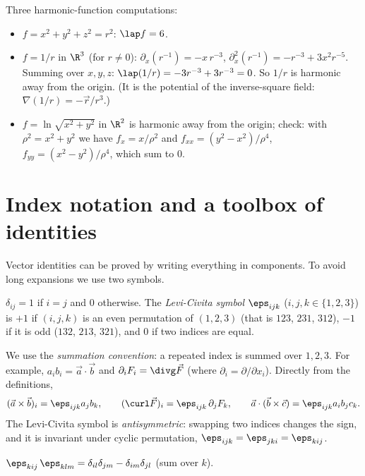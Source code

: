 \begin{example}
Three harmonic-function computations:
\begin{itemize}
  \item $f=x^2+y^2+z^2=r^2$: $\lap f=6$.
  \item $f=1/r$ in $\R^3$ (for $r\ne0$): $\partial_x(r^{-1})=-x\,r^{-3}$, $\partial_x^2(r^{-1})=-r^{-3}+3x^2r^{-5}$. Summing over $x,y,z$: $\lap(1/r)=-3r^{-3}+3r^{-3}=0$. So $1/r$ is harmonic away from the origin. (It is the potential of the inverse-square field: $\nabla(1/r)=-\vec r/r^3$.)
  \item $f=\ln\sqrt{x^2+y^2}$ in $\R^2$ is harmonic away from the origin; check: with $\rho^2=x^2+y^2$ we have $f_x=x/\rho^2$ and $f_{xx}=(y^2-x^2)/\rho^4$, $f_{yy}=(x^2-y^2)/\rho^4$, which sum to $0$.
\end{itemize}
\end{example}

\section{Index notation and a toolbox of identities}

Vector identities can be proved by writing everything in components. To avoid long expansions we use two symbols.

\begin{definition}
$\delta_{ij}=1$ if $i=j$ and $0$ otherwise. The \emph{Levi-Civita symbol} $\eps_{ijk}$ ($i,j,k\in\{1,2,3\}$) is $+1$ if $(i,j,k)$ is an even permutation of $(1,2,3)$ (that is $123$, $231$, $312$), $-1$ if it is odd ($132$, $213$, $321$), and $0$ if two indices are equal.
\end{definition}

We use the \emph{summation convention}: a repeated index is summed over $1,2,3$. For example, $a_ib_i=\vec a\cdot\vec b$ and $\partial_iF_i=\divg\vec F$ (where $\partial_i=\partial/\partial x_i$). Directly from the definitions,
\[
(\vec a\times\vec b)_i=\eps_{ijk}a_jb_k,\qquad(\curl\vec F)_i=\eps_{ijk}\,\partial_jF_k,\qquad\vec a\cdot(\vec b\times\vec c)=\eps_{ijk}a_ib_jc_k .
\]
The Levi-Civita symbol is \emph{antisymmetric}: swapping two indices changes the sign, and it is invariant under cyclic permutation, $\eps_{ijk}=\eps_{jki}=\eps_{kij}$.

\begin{lemma}\label{lem:epseps}
$\eps_{kij}\,\eps_{klm}=\delta_{il}\delta_{jm}-\delta_{im}\delta_{jl}$ (sum over $k$).
\end{lemma}

